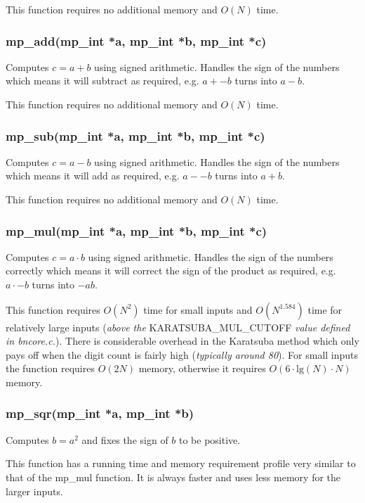 \documentclass[]{article}
\begin{document}
This function requires no additional memory and $O(N)$ time.

\subsubsection{mp\_add(mp\_int *a, mp\_int *b, mp\_int *c)}
Computes $c = a + b$ using signed arithmetic.  Handles the sign of the numbers which means it will subtract as 
required, e.g. $a + -b$ turns into $a - b$.

This function requires no additional memory and $O(N)$ time.

\subsubsection{mp\_sub(mp\_int *a, mp\_int *b, mp\_int *c)}
Computes $c = a - b$ using signed arithmetic.   Handles the sign of the numbers which means it will add as 
required, e.g. $a - -b$ turns into $a + b$.

This function requires no additional memory and $O(N)$ time.

\subsubsection{mp\_mul(mp\_int *a, mp\_int *b, mp\_int *c)}
Computes $c = a \cdot b$ using signed arithmetic.  Handles the sign of the numbers correctly which means it will 
correct the sign of the product as required, e.g. $a \cdot -b$ turns into $-ab$.

This function requires $O(N^2)$ time for small inputs and $O(N^{1.584})$ time for relatively large 
inputs (\textit{above the }KARATSUBA\_MUL\_CUTOFF \textit{value defined in bncore.c.}).  There is 
considerable overhead in the Karatsuba method which only pays off when the digit count is fairly high
(\textit{typically around 80}).  For small inputs the function requires $O(2N)$ memory, otherwise it
requires $O(6 \cdot \mbox{lg}(N) \cdot N)$ memory.


\subsubsection{mp\_sqr(mp\_int *a, mp\_int *b)}
Computes $b = a^2$ and fixes the sign of $b$ to be positive.

This function has a running time and memory requirement profile very similar to that of the 
mp\_mul function.  It is always faster and uses less memory for the larger inputs.
\end{document}
